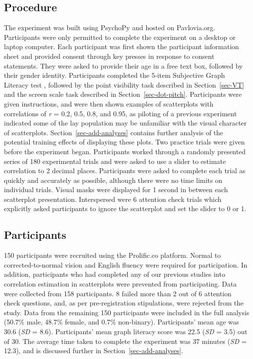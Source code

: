 \documentclass[sigconf]{acmart}
\begin{document}
\hypertarget{sec-gen-procedure}{%
\subsection{Procedure}\label{sec-gen-procedure}}

The experiment was built using PsychoPy \citep{pierce_2019} and hosted
on Pavlovia.org. Participants were only permitted to complete the
experiment on a desktop or laptop computer. Each participant was first
shown the participant information sheet and provided consent through key
presses in response to consent statements. They were asked to provide
their age in a free text box, followed by their gender identity.
Participants completed the 5-item Subjective Graph Literacy test
\citep{garcia_2016}, followed by the point visibility task described in
Section~\ref{sec-VT} and the screen scale task described in
Section~\ref{sec-dot-pitch}. Participants were given instructions, and
were then shown examples of scatterplots with correlations of \emph{r} =
0.2, 0.5, 0.8, and 0.95, as piloting of a previous experiment indicated
some of the lay population may be unfamiliar with the visual character
of scatterplots. Section~\ref{sec-add-analyses} contains further
analysis of the potential training effects of displaying these plots.
Two practice trials were given before the experiment began. Participants
worked through a randomly presented series of 180 experimental trials
and were asked to use a slider to estimate correlation to 2 decimal
places. Participants were asked to complete each trial as quickly and
accurately as possible, although there were no time limits on individual
trials. Visual masks were displayed for 1 second in between each
scatterplot presentation. Interspersed were 6 attention check trials
which explicitly asked participants to ignore the scatterplot and set
the slider to 0 or 1.

\hypertarget{sec-participants}{%
\subsection{Participants}\label{sec-participants}}

150 participants were recruited using the Prolific.co platform. Normal
to corrected-to-normal vision and English fluency were required for
participation. In addition, participants who had completed any of our
previous studies into correlation estimation in scatterplots
\citep{strain_2023, strain_2023b} were prevented from participating.
Data were collected from 158 participants. 8 failed more than 2 out of 6
attention check questions, and, as per pre-registration stipulations,
were rejected from the study. Data from the remaining 150 participants
were included in the full analysis (50.7\% male, 48.7\% female, and
0.7\% non-binary). Participants' mean age was 30.6 (\emph{SD} = 8.6).
Participants' mean graph literacy score was 22.5 (\emph{SD} = 3.5) out
of 30. The average time taken to complete the experiment was 37 minutes
(\emph{SD} = 12.3), and is discussed further in
Section~\ref{sec-add-analyses}.
\end{document}
